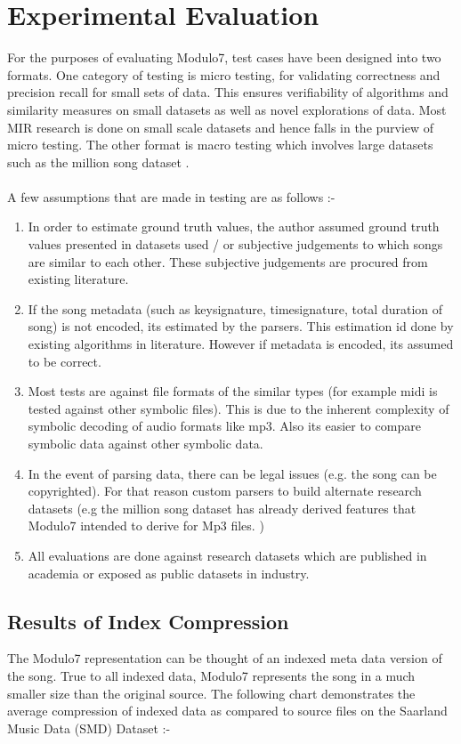 \chapter{Experimental Evaluation}

\noindent For the purposes of evaluating Modulo7, test cases have been designed into two formats. One category of testing is micro testing, for validating correctness and precision recall for small sets of data. This ensures verifiability of algorithms and similarity measures on small datasets as well as novel explorations of data. Most MIR research is done on small scale datasets and hence falls in the purview of micro testing. The other format is macro testing which involves large datasets such as the million song dataset \cite{msd}. \\\\
A few assumptions that are made in testing are as follows :-
\begin{enumerate}
\item In order to estimate ground truth values, the author assumed ground truth values presented in datasets used / or subjective judgements to which songs are similar to each other. These subjective judgements are procured from existing literature.
\item If the song metadata (such as keysignature, timesignature, total duration of song) is not encoded, its estimated by the parsers. This estimation id done by existing algorithms in literature. However if metadata is encoded, its assumed to be correct. 
\item Most tests are against file formats of the similar types (for example midi is tested against other symbolic files). This is due to the inherent complexity of symbolic decoding of audio formats like mp3. Also its easier to compare symbolic data against other symbolic data.
\item In the event of parsing data, there can be legal issues (e.g. the song can be copyrighted). For that reason custom parsers to build alternate research datasets (e.g the million song dataset has already derived features that Modulo7 intended to derive for Mp3 files. \cite{msd})
\item All evaluations are done against research datasets which are published in academia or exposed as public datasets in industry. 
\end{enumerate}

\section{Results of Index Compression}

\noindent The Modulo7 representation can be thought of an indexed meta data version of the song. True to all indexed data, Modulo7 represents the song in a much smaller size than the original source. The following chart demonstrates the average compression of indexed data as compared to source files on the Saarland Music Data (SMD) Dataset \cite{saarlandmsd}:-
